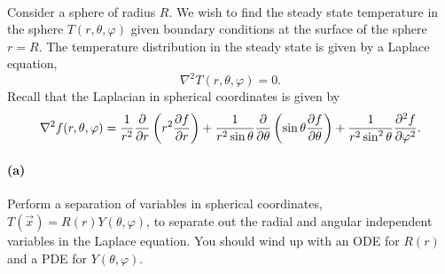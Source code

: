 \documentclass{article}
\begin{document}
\paragraph{}
Consider a sphere of radius $R$.  We wish to find the steady state temperature in the sphere $T(r,\theta,\varphi)$ given boundary conditions at the surface of the
sphere $r=R$.
The temperature distribution in the steady state is given by a Laplace equation,
	\begin{equation*}
		\nabla^{2}T(r,\theta,\varphi) = 0.
	\end{equation*}
Recall that the Laplacian in spherical coordinates is given by
	\begin{equation*}
		\nabla^{2}f(r,\theta,\varphi) = \frac{1}{r^{2}}\frac{\partial{}}{\partial{r}}\left(r^{2}\frac{\partial{f}}{\partial{r}}\right) + \frac{1}{r^{2}\sin\theta}\frac{\partial{}}{\partial{\theta}}\left(\sin\theta\frac{\partial{f}}{\partial{\theta}}\right) 
			+ \frac{1}{r^{2}\sin^{2}\theta}\frac{\partial^{2}{f}}{\partial{\varphi}^{2}}.
	\end{equation*}


\paragraph{(a)}		\extrapart
Perform a separation of variables in spherical coordinates, $T(\vec{x}) = R(r)Y(\theta,\varphi)$, to separate out the radial and angular independent variables in the
Laplace equation. You should
wind up with an ODE for $R(r)$ and a PDE for $Y(\theta,\varphi)$.  
\end{document}
